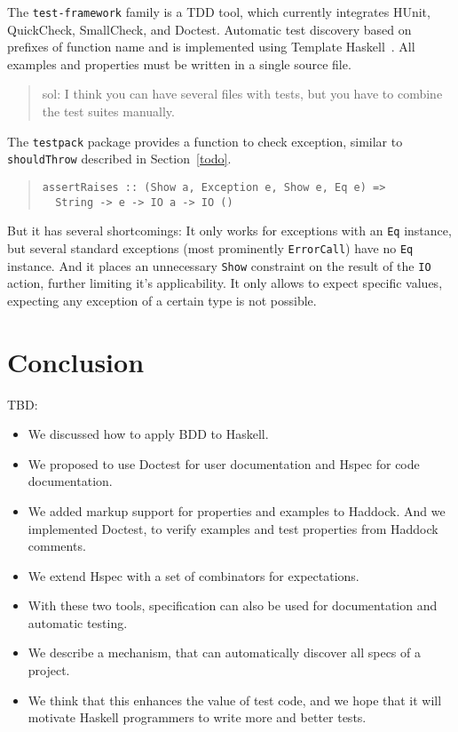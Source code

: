 \documentclass[preprint]{sigplanconf}
\begin{document}
The {\tt test-framework} family is a TDD tool,
which currently integrates HUnit, QuickCheck, SmallCheck, and Doctest.
Automatic test discovery based on prefixes of function name
and is implemented using Template Haskell~\cite{template-haskell}.
All examples and properties must be written in a single
source file.

\begin{quote}
    sol: I think you can have several files with tests, but you have
    to combine the test suites manually.
\end{quote}

The {\tt testpack} package provides a function to check
exception, similar to {\tt shouldThrow} described in Section~\ref{todo}.

\begin{quote}
\small
\begin{verbatim}
assertRaises :: (Show a, Exception e, Show e, Eq e) =>
  String -> e -> IO a -> IO ()
\end{verbatim}
\end{quote}

\noindent But it has several shortcomings:
It only works for exceptions with an {\tt Eq} instance,
but several standard exceptions (most
prominently {\tt ErrorCall}) have no {\tt Eq} instance.
And it places an unnecessary {\tt Show} constraint on the
result of the {\tt IO} action, further limiting it's applicability.
It only allows to expect specific values, expecting
any exception of a certain type is not possible.

\section{Conclusion}

TBD:

\begin{itemize}
\item
    We discussed how to apply BDD to Haskell.
\item
    We proposed to use Doctest for user documentation and Hspec for
    code documentation.
\item
    We added markup support for properties and examples to Haddock.
    And we implemented Doctest, to verify examples and test properties
    from Haddock comments.
\item
    We extend Hspec with a set of combinators for expectations.
\item
    With these two tools, specification can also be used for
    documentation and automatic testing.
\item
    We describe a mechanism, that can automatically discover all specs
    of a project.
\item
    We think that this enhances the value of test code, and we hope
    that it will motivate Haskell programmers to write more and better
    tests.
\end{itemize}
\end{document}
